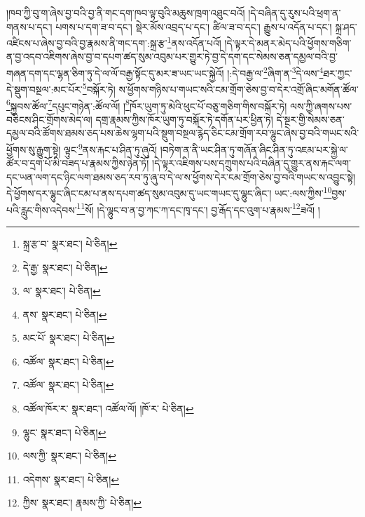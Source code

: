།ཁབ་ཀྱི་བུ་ག་ཞེས་བྱ་བའི་བྱ་ནི་གང་དག་ཁབ་ལྟ་བུའི་མཆུས་ཁྲག་འཐུང་བའོ། །དེ་བཞིན་དུ་རུས་པའི་ཕྲག་ན་གནས་པ་དང་། པགས་པ་དག་ཟ་བ་དང་། སྡེར་མོས་འབྲད་པ་དང་། ཚིལ་ཟ་བ་དང་། རྒྱུས་པ་འདོན་པ་དང་། སྐྲ་ཤད་འཛིངས་པ་ཞེས་བྱ་བའི་བྱ་རྣམས་ནི་གང་དག་:སྐྲ་རྩ་\footnote{སྐྲ་རྩ་བ་  སྣར་ཐང་།  པེ་ཅིན། }ནས་འདོན་པའོ། །དེ་ལྟར་དེ་མནར་མེད་པའི་ཕྱོགས་གཅིག་ན་བྱ་འདབ་འཇིགས་ཞེས་བྱ་བ་དཔག་ཚད་སུམ་འབུམ་པར་གྱུར་ཏེ་བྱ་དེ་དག་དང་སེམས་ཅན་དམྱལ་བའི་བྱ་གཞན་དག་དང་ལྷན་ཅིག་ཏུ་དེ་ལ་ལོ་བརྒྱ་སྟོང་དུ་མར་ཟ་ཡང་ཡང་སྐྱེའོ། །:དེ་བརྒྱ་ལ་\footnote{དེ་རྒྱ་  སྣར་ཐང་།  པེ་ཅིན། }ཞིག་ན་\footnote{ལ་  སྣར་ཐང་།  པེ་ཅིན། }དེ་ལས་\footnote{ནས་  སྣར་ཐང་།  པེ་ཅིན། }ཐར་ཀྱང་དེ་སྡུག་བསྔལ་:མང་པོར་\footnote{མང་པོ་  སྣར་ཐང་།  པེ་ཅིན། }བསྐོར་ཏེ། ས་ཕྱོགས་གཉིས་པ་གཡང་སའི་ངམ་གྲོག་ཅེས་བྱ་བ་དེར་འགྲོ་ཞིང་མགོན་ཚོལ་\footnote{འཚོལ་  སྣར་ཐང་།  པེ་ཅིན། }སྐྱབས་ཚོལ་\footnote{འཚོལ་  སྣར་ཐང་།  པེ་ཅིན། }དཔུང་གཉེན་:ཚོལ་ལོ། །\footnote{འཚོལ་ཁོར་ར་  སྣར་ཐང་། འཚོལ་ལོ། །ཁོ་ར་  པེ་ཅིན། }ཁོར་ཡུག་ཏུ་མེའི་ཕུང་པོ་བཅུ་གཅིག་གིས་བསྐོར་ཏེ། ལས་ཀྱི་ཞགས་པས་བཅིངས་ཤིང་གྲོགས་མེད་ལ། དགྲ་རྣམས་ཀྱིས་ཁོར་ཡུག་ཏུ་བསྐོར་ཏེ་དགོན་པར་ཕྱིན་ཏེ། དེ་སྔར་གྱི་སེམས་ཅན་དམྱལ་བའི་ཚོགས་ཐམས་ཅད་པས་ཆེས་ལྷག་པའི་སྡུག་བསྔལ་རྙེད་ཅིང་ངམ་གྲོག་རབ་ལྷུང་ཞེས་བྱ་བའི་གཡང་སའི་ཕྱོགས་སུ་རྒྱུག་སྟེ། ལྟུང་\footnote{ལྷུང་  སྣར་ཐང་།  པེ་ཅིན། }ནས་རྐང་པ་ཤིན་ཏུ་ཞུའོ། །བཏེག་ན་ནི་ཡང་ཤིན་ཏུ་གཞོན་ཞིང་ཤིན་ཏུ་འཇམ་པར་སྐྱེ་ལ་ཚོར་བ་དྲག་པོ་མི་བཟད་པ་རྣམས་ཀྱིས་ཉེན་ཏོ། །དེ་ལྟར་འཇིགས་པས་དཀྲུགས་པའི་བཞིན་དུ་གྱུར་ནས་རྐང་ལག་དང་ཡན་ལག་དང་ཉིང་ལག་ཐམས་ཅད་རབ་ཏུ་ཞུ་བ་དེ་ལ་ས་ཕྱོགས་དེར་ངམ་གྲོག་ཅེས་བྱ་བའི་གཡང་ས་འབྱུང་སྟེ། དེ་ཕྱོགས་དར་ལྷུང་ཞིང་ངམ་པ་ནས་དཔག་ཚད་སུམ་འབུམ་དུ་ཡང་གཡང་དུ་ལྷུང་ཞིང་། ཡང་:ལས་ཀྱིས་\footnote{ལས་ཀྱི་  སྣར་ཐང་།  པེ་ཅིན། }བྱས་པའི་རླུང་གིས་འདེབས་\footnote{འདེགས་  སྣར་ཐང་།  པེ་ཅིན། }སོ། །དེ་ལྷུང་བ་ན་བྱ་ཀང་ཀ་དང་ཁྭ་དང་། བྱ་རྒོད་དང་འུག་པ་རྣམས་\footnote{ཀྱིས་  སྣར་ཐང་། རྣམས་ཀྱི་  པེ་ཅིན། }ཟའོ། །
